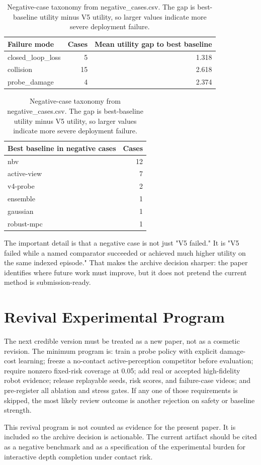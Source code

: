 \documentclass{article}
\begin{document}
\begin{table}[t]
\centering
\small
\begin{tabular}{lrr}
\toprule
Failure mode & Cases & Mean utility gap to best baseline \\
\midrule
closed\_loop\_loss & 5 & 1.318 \\
collision & 15 & 2.618 \\
probe\_damage & 4 & 2.374 \\
\bottomrule
\end{tabular}
\qquad
\begin{tabular}{lr}
\toprule
Best baseline in negative cases & Cases \\
\midrule
nbv & 12 \\
active-view & 7 \\
v4-probe & 2 \\
ensemble & 1 \\
gaussian & 1 \\
robust-mpc & 1 \\
\bottomrule
\end{tabular}
\caption{Negative-case taxonomy from negative\_cases.csv. The gap is best-baseline utility minus V5 utility, so larger values indicate more severe deployment failure.}
\label{tab:negtaxonomy}
\end{table}


The important detail is that a negative case is not just "V5 failed." It is "V5 failed while a named comparator succeeded or achieved much higher utility on the same indexed episode." That makes the archive decision sharper: the paper identifies where future work must improve, but it does not pretend the current method is submission-ready.

\section{Revival Experimental Program}
The next credible version must be treated as a new paper, not as a cosmetic revision. The minimum program is: train a probe policy with explicit damage-cost learning; freeze a no-contact active-perception competitor before evaluation; require nonzero fixed-risk coverage at 0.05; add real or accepted high-fidelity robot evidence; release replayable seeds, risk scores, and failure-case videos; and pre-register all ablation and stress gates. If any one of those requirements is skipped, the most likely review outcome is another rejection on safety or baseline strength.

This revival program is not counted as evidence for the present paper. It is included so the archive decision is actionable. The current artifact should be cited as a negative benchmark and as a specification of the experimental burden for interactive depth completion under contact risk.
\end{document}
